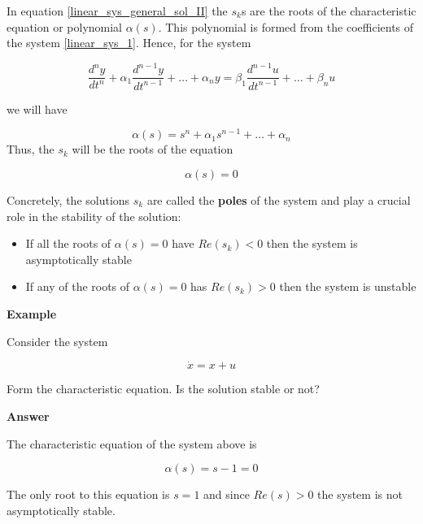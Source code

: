In equation \ref{linear_sys_general_sol_II} the $s_k$s are the roots of the characteristic equation or polynomial $\alpha(s)$. This polynomial is formed from the coefficients of the system
\ref{linear_sys_1}. Hence, for the system

\begin{equation}
\frac{d^{n}y}{dt^{n}} + \alpha_{1}\frac{d^{n-1}y}{dt^{n-1}} + \dots + \alpha_{n}y = \beta_{1}\frac{d^{n-1}u}{dt^{n-1}} + \dots + \beta_{n}u  
\nonumber
\end{equation} 

we will have

\begin{equation}
\alpha(s) = s^n +\alpha_{1}s^{n-1} + \dots + \alpha_n   
\label{linear_sys_charact_pol}
\end{equation}
Thus, the $s_k$ will be the roots of the equation


\begin{equation}
\alpha(s) = 0 
\label{linear_sys_charact_pol_eq}
\end{equation}

Concretely, the solutions $s_k$ are called the \textbf{poles}  of the system and play a crucial role in the stability of the solution:

\begin{itemize}
\item If all the roots of $\alpha(s)=0$ have $Re(s_k) < 0 $ then the system is asymptotically stable
\item If any of the roots of $\alpha(s)=0$ has $Re(s_k) > 0 $ then the system is  unstable
\end{itemize}

\begin{framed}
\label{linear_sys_exe_1}

\textbf{Example}

Consider the system

\begin{equation}
\dot{x} = x +u \nonumber
\end{equation}

Form the characteristic equation. Is the solution stable or not?

\textbf{Answer}

The characteristic equation of the system above is

\begin{equation}
\alpha(s) = s -1 =0 \nonumber
\end{equation}

The only root to this equation is $s=1$ and since $Re(s) > 0$ the system is not asymptotically stable.

\end{framed}



